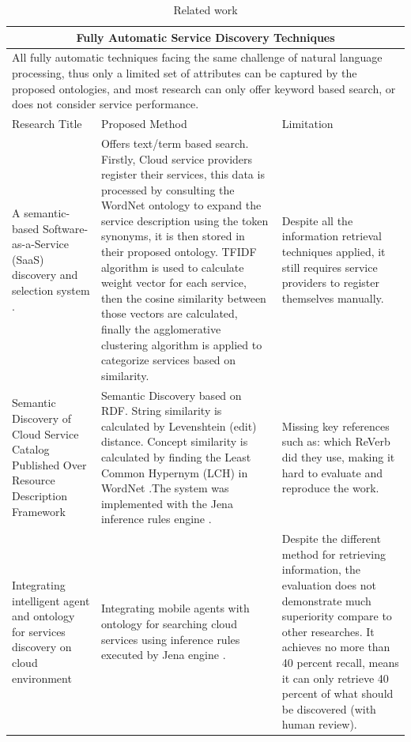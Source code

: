\begin{longtable}{ p{30mm} | p{50mm} | p{50mm} } 
\caption{Related work \label{table:related_work}} \\
\hline
\multicolumn{3}{c}{ \cellcolor{yellow} Fully Automatic Service Discovery Techniques}\\
\hline
\multicolumn{3}{p{140mm}}{All fully automatic techniques facing the same challenge of natural language processing, thus only a limited set of attributes can be captured by the proposed ontologies, and most research can only offer keyword based search, or does not consider service performance.}\\
\hline
Research Title & Proposed Method & Limitation \\ 
\hline
	A semantic-based Software-as-a-Service (SaaS) discovery and selection system \cite{SaaSdiscoverySelectionSystem}. &
    Offers text/term based search. Firstly, Cloud service providers register their services, this data is  processed by consulting the WordNet \cite{WordNet} ontology to expand the service description using the token synonyms, it is  then stored in their proposed ontology. TFIDF algorithm is used to calculate weight vector for each service, then the cosine similarity between those vectors are calculated, finally the agglomerative clustering algorithm is applied to categorize services based on similarity.&
    Despite all the information retrieval techniques applied, it still requires service providers to register themselves manually. \\
\hline
	Semantic Discovery of Cloud Service Catalog Published Over Resource Description Framework \cite{Vasudevan2014SemanticDO} &
    Semantic Discovery based on RDF. String similarity is calculated by Levenshtein (edit) distance. Concept  similarity is calculated by finding the Least Common Hypernym (LCH) in WordNet \cite{WordNet}.The system was implemented with the Jena inference rules engine \cite{jena}.&
    Missing key references such as: which ReVerb did they use, making it hard to evaluate and reproduce the work.\\
\hline
	Integrating intelligent agent and ontology for services discovery on cloud environment
    \cite{IntelligentAgentOntologyServicesDiscovery} & 
    Integrating mobile agents with ontology for searching cloud services
    using inference rules executed by Jena engine \cite{jena}.& 
    Despite the different method for retrieving information, the evaluation does not demonstrate much superiority compare to other researches. It achieves no more than 40 percent recall, means it can only retrieve 40 percent of what should be discovered (with human review).\\ 

\end{longtable}
